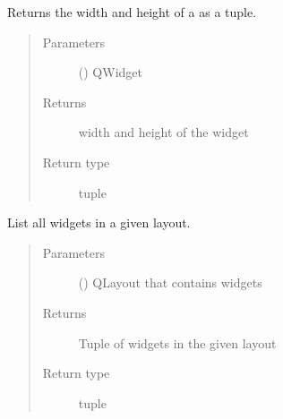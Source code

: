 \documentclass[letterpaper,10pt,english]{sphinxmanual}
\begin{document}
\begin{fulllineitems}

\begin{fulllineitems}
\label{\detokenize{polo.windows:polo.windows.main_window.MainWindow.get_widget_dims}}
Returns the width and height of a 
as a tuple.
\begin{quote}\begin{description}
\item[{Parameters}] \leavevmode
{} () \textendash{} QWidget

\item[{Returns}] \leavevmode
width and height of the widget

\item[{Return type}] \leavevmode
tuple

\end{description}\end{quote}

\end{fulllineitems}


\begin{fulllineitems}
\label{\detokenize{polo.windows:polo.windows.main_window.MainWindow.layout_widget_lister}}
List all widgets in a given layout.
\begin{quote}\begin{description}
\item[{Parameters}] \leavevmode
{} () \textendash{} QLayout that contains widgets

\item[{Returns}] \leavevmode
Tuple of widgets in the given layout

\item[{Return type}] \leavevmode
tuple

\end{description}\end{quote}

\end{fulllineitems}


\end{fulllineitems}
\end{document}
